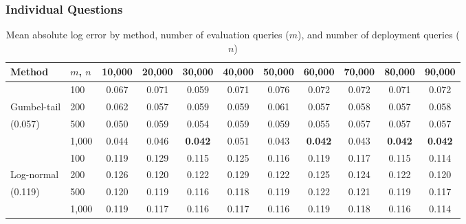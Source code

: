 \subsubsection{Individual Questions}
\begin{table}[h]
\centering
\begin{tabular}{llccccccccc}
\toprule
Method & $m$, $n$ & 10,000 & 20,000 & 30,000 & 40,000 & 50,000 & 60,000 & 70,000 & 80,000 & 90,000 \\
\midrule
 & 100 & 0.067 & 0.071 & 0.059 & 0.071 & 0.076 & 0.072 & 0.072 & 0.071 & 0.072 \\
Gumbel-tail & 200 & 0.062 & 0.057 & 0.059 & 0.059 & 0.061 & 0.057 & 0.058 & 0.057 & 0.058 \\
(0.057) & 500 & 0.050 & 0.059 & 0.054 & 0.059 & 0.059 & 0.055 & 0.057 & 0.057 & 0.057 \\
& 1,000 & 0.044 & 0.046 & \textbf{0.042} & 0.051 & 0.043 & \textbf{0.042} & 0.043 & \textbf{0.042} & \textbf{0.042} \\
\midrule
 & 100 & 0.119 & 0.129 & 0.115 & 0.125 & 0.116 & 0.119 & 0.117 & 0.115 & 0.114 \\
Log-normal & 200 & 0.126 & 0.120 & 0.122 & 0.129 & 0.122 & 0.125 & 0.124 & 0.122 & 0.120 \\
(0.119) & 500 & 0.120 & 0.119 & 0.116 & 0.118 & 0.119 & 0.122 & 0.121 & 0.119 & 0.117 \\
& 1,000 & 0.119 & 0.117 & 0.116 & 0.117 & 0.116 & 0.119 & 0.118 & 0.116 & 0.114 \\
\bottomrule
\end{tabular}
\caption{Mean absolute log error by method, number of evaluation queries ($m$), and number of deployment queries ($n$)}
\end{table}

